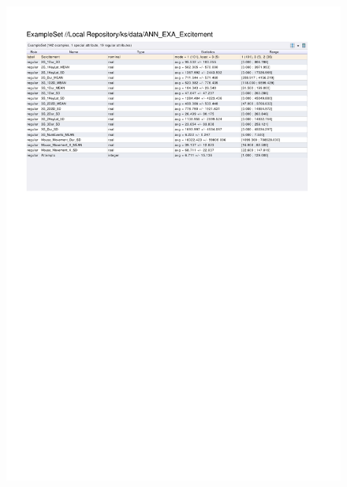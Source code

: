 \begin{figure}[htp]
  \centerline{\includegraphics[trim=0 570 0 60,clip,width=16.09cm]{results/ANN_EXA_Excitement.pdf}} \caption{
} \label{ANN_EXA_Excitement}
\end{figure}

